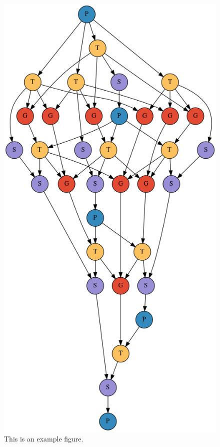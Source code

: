       \begin{figure}
	\centering	
	\includegraphics[scale=0.3]{cholesky35.png}
	\caption{This is an example figure.}	
	\label{intro.fig}
      \end{figure}

